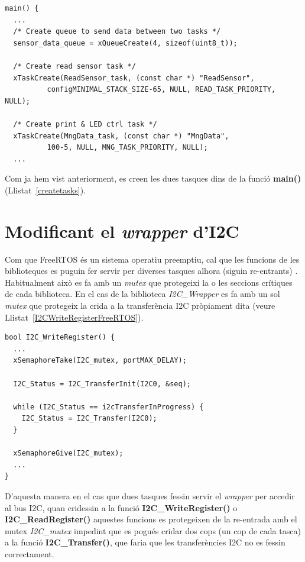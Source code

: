 \begin{lstlisting}[style=customc,caption={Creació de tasques},label=createtasks]
main() {
  ...
  /* Create queue to send data between two tasks */
  sensor_data_queue = xQueueCreate(4, sizeof(uint8_t));

  /* Create read sensor task */
  xTaskCreate(ReadSensor_task, (const char *) "ReadSensor",
          configMINIMAL_STACK_SIZE-65, NULL, READ_TASK_PRIORITY, NULL);

  /* Create print & LED ctrl task */
  xTaskCreate(MngData_task, (const char *) "MngData",
          100-5, NULL, MNG_TASK_PRIORITY, NULL);
  ...
\end{lstlisting}

Com ja hem vist anteriorment, es creen les dues tasques dins de la funció {\bf main()} (Llistat~\ref{createtasks}).

\section{Modificant el {\em wrapper} d'I2C}
\label{sec:wrapperI2C}
Com que FreeRTOS és un sistema operatiu preemptiu, cal que les funcions de les biblioteques es puguin fer servir per diverses tasques alhora (siguin re-entrants) \cite[236]{FreeRTOSBook}. Habitualment això es fa amb un {\em mutex} que protegeixi la o les seccions crítiques de cada biblioteca. En el cas de la biblioteca {\em I2C\_Wrapper} es fa amb un sol {\em mutex} que protegeix la crida a la transferència \gls{I2C} pròpiament dita (veure Llistat~\ref{I2CWriteRegisterFreeRTOS}).

\begin{lstlisting}[style=customc,caption={Part de la funció I2C\_WriteRegister() adaptada a FreeRTOS}, label=I2CWriteRegisterFreeRTOS]
bool I2C_WriteRegister() {
  ...
  xSemaphoreTake(I2C_mutex, portMAX_DELAY);

  I2C_Status = I2C_TransferInit(I2C0, &seq);

  while (I2C_Status == i2cTransferInProgress) {
    I2C_Status = I2C_Transfer(I2C0);
  }

  xSemaphoreGive(I2C_mutex);
  ...
}
\end{lstlisting}

D'aquesta manera en el cas que dues tasques fessin servir el {\em wrapper} per accedir al bus \gls{I2C}, quan cridessin a la funció {\bf I2C\_WriteRegister()} o {\bf I2C\_ReadRegister()} aquestes funcions es protegeixen de la re-entrada amb el mutex {\em I2C\_mutex} impedint que es pogués cridar dos cops (un cop de cada tasca) a la funció {\bf I2C\_Transfer()}, que faria que les transferències \gls{I2C} no es fessin correctament.

